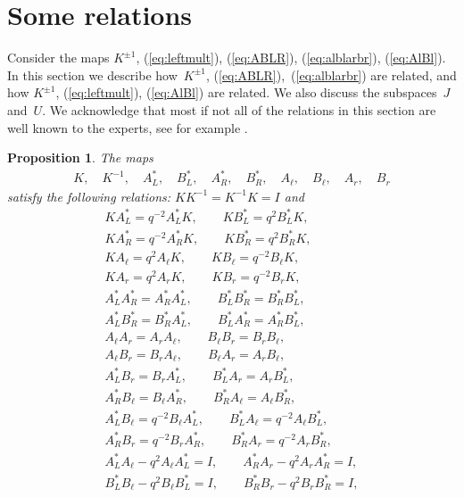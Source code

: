 \documentclass[11pt]{article}
\numberwithin{equation}{section}
\numberwithin{equation}{section}
\newtheorem{Proposition}[Theorem]{Proposition}
 { \theoremstyle{definition}
\newtheorem{Definition}[Theorem]{Definition}
\newtheorem{Example}[Theorem]{Example}
\newtheorem{Note}[Theorem]{Note}
}
\begin{document}
{\section{Some relations}\label{section9}

Consider the maps $K^{\pm 1}$, (\ref{eq:leftmult}), (\ref{eq:ABLR}), (\ref{eq:alblarbr}), (\ref{eq:AlBl}). In this section we describe how~$K^{\pm 1}$, (\ref{eq:ABLR}),~(\ref{eq:alblarbr}) are related, and how $K^{\pm 1}$, (\ref{eq:leftmult}), (\ref{eq:AlBl}) are related. We also discuss the subspaces~$J$ and~$U$.
We acknowledge that most if not all of the relations in this section are well known to the experts, see for example
\cite[Sections~3.3 and 3.4]{kashiwara}.
\begin{Proposition}\label{thm:v1} The maps
\begin{gather}\label{eq:maplist1}
K, \quad K^{-1},\quad A^*_L,
\quad
B^*_L,
\quad
A^*_R,
\quad
B^*_R,
\quad
A_\ell,
\quad
B_\ell,
\quad
A_r,
\quad
B_r
\end{gather}
satisfy the following relations: $K K^{-1} = K^{-1}K = I$ and
\begin{gather*}
K A^*_L = q^{-2} A^*_L K,\qquad K B^*_L = q^2 B^*_L K,\\
K A^*_R = q^{-2} A^*_R K,\qquad K B^*_R = q^{2} B^*_R K,\\
K A_\ell = q^{2} A_\ell K,\qquad K B_\ell = q^{-2} B_\ell K,\\
K A_r = q^{2} A_r K,\qquad K B_r = q^{-2} B_r K,\\
A^*_L A^*_R = A^*_R A^*_L, \qquad B^*_L B^*_R = B^*_R B^*_L,\\
A^*_L B^*_R = B^*_R A^*_L, \qquad B^*_L A^*_R = A^*_R B^*_L,\\
A_\ell A_r = A_r A_\ell, \qquad B_\ell B_r = B_r B_\ell,\\
A_\ell B_r = B_r A_\ell, \qquad B_\ell A_r = A_r B_\ell,\\
A^*_L B_r = B_r A^*_L, \qquad B^*_L A_r = A_r B^*_L,\\
 A^*_R B_\ell = B_\ell A^*_R, \qquad B^*_R A_\ell = A_\ell B^*_R,\\
A^*_L B_\ell = q^{-2} B_\ell A^*_L, \qquad B^*_L A_\ell = q^{-2} A_\ell B^*_L,\\
A^*_R B_r = q^{-2} B_r A^*_R, \qquad B^*_R A_r = q^{-2} A_r B^*_R,\\
 A^*_L A_\ell - q^2 A_{\ell} A^*_L = I, \qquad A^*_R A_r - q^2 A_r A^*_R = I,\\
 B^*_L B_\ell - q^2 B_{\ell} B^*_L = I,\qquad B^*_R B_r - q^2 B_r B^*_R = I,\\

\end{gather*}
\end{Proposition}}
\end{document}
